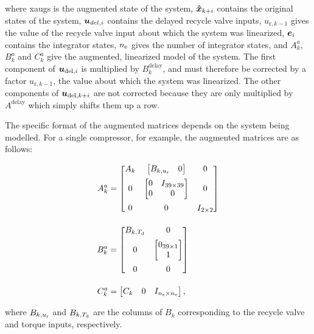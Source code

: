 \noindent where \glspl*{xaug} is the augmented state of the system, 
$\bm{\hat{x}}_{k+i}$ contains the original states of the system, 
$\bm{u}_{del,i}$ contains the delayed recycle valve inputs,
$u_{\text{r},k-1}$ gives the value of the recycle valve input about which the system was linearized,
$\bm{e}_i$ contains the integrator states,
$n_\text{e}$ gives the number of integrator states,
and $A_k^a$, $B_k^a$ and $C_k^a$ give the augmented, linearized model of the system.
The first component of $\bm{u}_{\text{del},i}$  is multiplied by $B_k^\text{delay}$, and must therefore be corrected by a factor $u_{\text{r},k-1}$, the value about which the system was linearized. 
The other components of $\bm{u}_{\text{del},k+i}$ are not corrected because they are only multiplied by $A^\text{delay}$ which simply shifts them up a row.

The specific format of the augmented matrices depends on the system being modelled. For a single compressor, for example, the augmented matrices are as follows:

\begin{equation}
  \begin{split}
    A_k^a & =
    \begin{bmatrix}
      A_k & \begin{bmatrix} B_{k,u\ut{r}} & 0 \end{bmatrix} & 0\matskip{0.5em}
      0 & \begin{bmatrix} 0 & I_{39\times 39}\\ 0 & 0\end{bmatrix} & 0\matskip{0.5em}
      0 & 0 & I_{2\times 2}
    \end{bmatrix}\\[1em]
    B_k^a & = 
    \begin{bmatrix}
      B_{k,T\ut{d}} & 0\matskip{0.5em}
      0 & \begin{bmatrix} 0_{39\times 1}\\ 1 \end{bmatrix} \matskip{0.5em}
      0 & 0
    \end{bmatrix}\\[1em]
    C_k^a & = \begin{bmatrix}
      C_k & 0 & I_{n\ut{e} \times n\ut{e}}
    \end{bmatrix},
  \end{split}
\end{equation}

where $B_{k,u_\text{r}}$ and $B_{k,T_\text{d}}$ are the columns of $B_k$ corresponding to the recycle valve and torque inputs, respectively.

